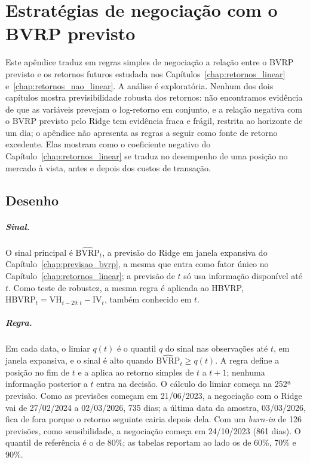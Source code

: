 \chapter{Estratégias de negociação com o BVRP previsto}
\label{app:estrategias}

Este apêndice traduz em regras simples de negociação a relação entre o BVRP
previsto e os retornos futuros estudada nos
Capítulos~\ref{chap:retornos_linear} e~\ref{chap:retornos_nao_linear}. A
análise é exploratória. Nenhum dos dois capítulos mostra previsibilidade
robusta dos retornos: não encontramos evidência de que as variáveis prevejam o
log-retorno em conjunto, e a
relação negativa com o BVRP previsto pelo Ridge tem evidência fraca e frágil,
restrita ao horizonte de um dia; o apêndice não apresenta as regras a seguir como fonte
de retorno excedente. Elas mostram como o coeficiente negativo do
Capítulo~\ref{chap:retornos_linear} se traduz no desempenho de uma posição no
mercado à vista, antes e depois dos custos de transação.

\section{Desenho}
\label{sec:estr-desenho}

\paragraph{Sinal.} O sinal principal é $\widehat{\text{BVRP}}_t$, a previsão
do Ridge em janela expansiva do Capítulo~\ref{chap:previsao_bvrp}, a mesma que
entra como fator único no Capítulo~\ref{chap:retornos_linear}; a previsão de $t$ só
usa informação disponível até $t$. Como teste de robustez, a mesma regra é
aplicada ao HBVRP,
$\text{HBVRP}_t = \text{VH}_{t-29:t} - \text{IV}_t$, também
conhecido em $t$.

\paragraph{Regra.} Em cada data, o limiar $q(t)$ é o quantil $q$ do sinal nas
observações até $t$, em janela expansiva, e o sinal é alto quando
$\widehat{\text{BVRP}}_t \ge q(t)$. A regra define a posição no fim de $t$ e a
aplica ao retorno simples de $t$ a $t+1$; nenhuma informação posterior a $t$
entra na decisão. O cálculo do limiar começa na 252ª previsão. Como as
previsões começam em 21/06/2023, a negociação com o Ridge vai de 27/02/2024 a
02/03/2026, 735 dias; a última data da amostra, 03/03/2026, fica de fora porque
o retorno seguinte cairia depois dela. Com um \textit{burn-in} de 126
previsões, como sensibilidade, a negociação começa em 24/10/2023 (861 dias). O
quantil de referência é o de 80\%; as tabelas reportam ao lado os de 60\%,
70\% e 90\%.

